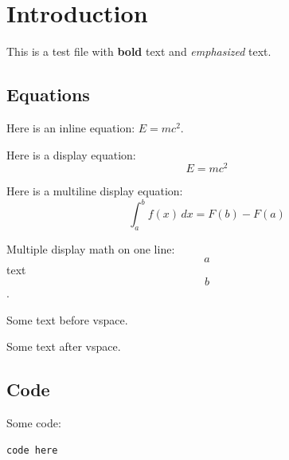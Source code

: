 \documentclass{article}
\begin{document}
\section{Introduction}
This is a test file with %
\textbf{bold} text and \emph{emphasized} text.

\subsection{Equations}
Here is an inline equation: $E=mc^2$.

Here is a display equation:
\[
E = mc^2
\]

Here is a multiline display equation:
\[
\int_a^b f(x) \, dx = F(b) - F(a)
\]

Multiple display math on one line: \[a\] text \[b\].

\vspace{10pt}
\medskip
\smallskip
\bigskip

Some text before vspace.

\vspace{20pt}

Some text after vspace.

\subsection{Code}
Some code:
\begin{verbatim}
code here
\end{verbatim}
\end{document}
